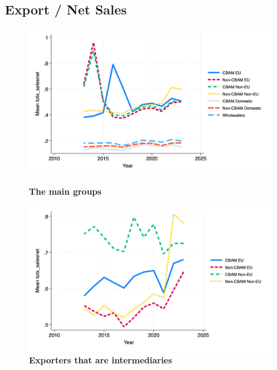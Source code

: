 \documentclass{article}
\begin{document}
\subsection{Export / Net Sales}
\begin{figure}[H]
\centering
\includegraphics[width=0.95\textwidth]{totx_salesnet_main_groups.png}
\caption{\textbf{The main groups}}
\includegraphics[width=0.95\textwidth]{totx_salesnet_ei.png}
\caption{\textbf{Exporters that are intermediaries}}
\end{figure}
\end{document}
